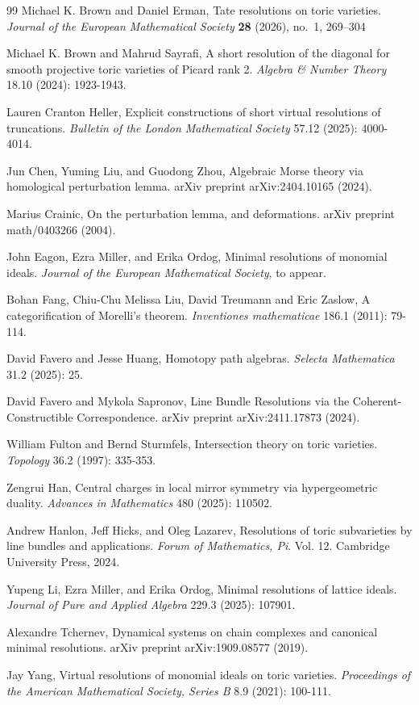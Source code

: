 \documentclass[11pt,reqno]{amsart}
\theoremstyle{definition}
\numberwithin{equation}{section}
\begin{document}
\begin{thebibliography}{99}
     Michael K. Brown and Daniel Erman, Tate resolutions on toric varieties. \textit{Journal of the European Mathematical Society} {\bf 28} (2026), no.~1, 269--304

     Michael K. Brown and Mahrud Sayrafi, A short resolution of the diagonal for smooth projective toric varieties of Picard rank 2. \textit{Algebra \& Number Theory} 18.10 (2024): 1923-1943.

     Lauren Cranton Heller, Explicit constructions of short virtual resolutions of truncations. \textit{Bulletin of the London Mathematical Society} 57.12 (2025): 4000-4014.

     Jun Chen, Yuming Liu, and Guodong Zhou, Algebraic Morse theory via homological perturbation lemma. arXiv preprint arXiv:2404.10165 (2024).

     Marius Crainic, On the perturbation lemma, and deformations. arXiv preprint math/0403266 (2004).


     John Eagon, Ezra Miller, and Erika Ordog, Minimal resolutions of monomial ideals. \textit{Journal of the European Mathematical Society}, to appear.

     Bohan Fang, Chiu-Chu Melissa Liu, David Treumann and Eric Zaslow, A categorification of Morelli's theorem. \textit{Inventiones mathematicae} 186.1 (2011): 79-114.

     David Favero and Jesse Huang, Homotopy path algebras. \textit{Selecta Mathematica} 31.2 (2025): 25.

     David Favero and Mykola Sapronov, Line Bundle Resolutions via the Coherent-Constructible Correspondence. arXiv preprint arXiv:2411.17873 (2024).

     William Fulton and Bernd Sturmfels, Intersection theory on toric varieties. \textit{Topology} 36.2 (1997): 335-353.

     Zengrui Han, Central charges in local mirror symmetry via hypergeometric duality. \textit{Advances in Mathematics} 480 (2025): 110502.

     Andrew Hanlon, Jeff Hicks, and Oleg Lazarev, Resolutions of toric subvarieties by line bundles and applications. \textit{Forum of Mathematics, Pi}. Vol. 12. Cambridge University Press, 2024.

     Yupeng Li, Ezra Miller, and Erika Ordog, Minimal resolutions of lattice ideals. \textit{Journal of Pure and Applied Algebra} 229.3 (2025): 107901.


     Alexandre Tchernev, Dynamical systems on chain complexes and canonical minimal resolutions. arXiv preprint arXiv:1909.08577 (2019).

     Jay Yang, Virtual resolutions of monomial ideals on toric varieties. \textit{Proceedings of the American Mathematical Society, Series B} 8.9 (2021): 100-111.


    
\end{thebibliography}
\end{document}
